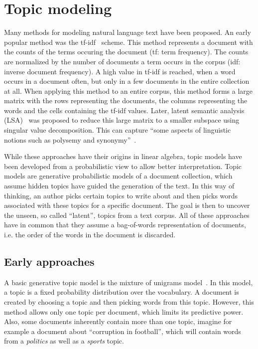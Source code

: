\documentclass[
        a4paper,
        titlepage,
        twoside,
        parskip,
        numbers=noenddot
        ]{scrbook}
\theoremstyle{break}
\begin{document}
\section{Topic modeling}
Many methods for modeling natural language text have been proposed.
An early popular method was the tf-idf~\cite{SparckJones1972} scheme.
This method represents a document with the counts of the terms occuring the document (tf: term frequency).
The counts are normalized by the number of documents a term occurs in the corpus (idf: inverse document frequency).
A high value in tf-idf is reached, when a word occurs in a document often, but only in a few documents in the entire collection at all.
When applying this method to an entire corpus, this method forms a large matrix with the rows representing the documents, the columns representing the words and the cells containing the tf-idf values.
Later, latent semantic analysis (LSA)~\cite{Deerwester1990} was proposed to reduce this large matrix to a smaller subspace using singular value decomposition.
This can capture ``some aspects of linguistic notions such as polysemy and synonymy''~\cite{Blei2003}.

While these approaches have their origins in linear algebra, topic models have been developed from a probabilistic view to allow better interpretation.
Topic models are generative probabilistic models of a document collection, which assume hidden topics have guided the generation of the text.
In this way of thinking, an author picks certain topics to write about and then picks words associated with these topics for a specific document.
The goal is then to uncover the unseen, so called ``latent'', topics from a text corpus.
All of these approaches have in common that they assume a bag-of-words representation of documents, i.e. the order of the words in the document is discarded.

\subsection{Early approaches}
A basic generative topic model is the mixture of unigrams model~\cite{Nigam2000}.
In this model, a topic is a fixed probability distribution over the vocabulary.
A document is created by choosing a topic and then picking words from this topic.
However, this method allows only one topic per document, which limits its predictive power.
Also, some documents inherently contain more than one topic, imagine for example a document about ``corruption in football'', which will contain words from a \emph{politics} as well as a \emph{sports} topic.
\end{document}
